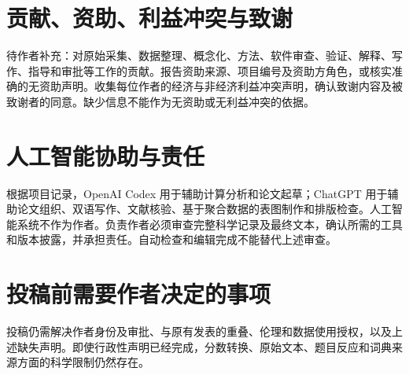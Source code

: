 \section{贡献、资助、利益冲突与致谢}
待作者补充：对原始采集、数据整理、概念化、方法、软件审查、验证、解释、写作、指导和审批等工作的贡献。报告资助来源、项目编号及资助方角色，或核实准确的无资助声明。收集每位作者的经济与非经济利益冲突声明，确认致谢内容及被致谢者的同意。缺少信息不能作为无资助或无利益冲突的依据。

\section{人工智能协助与责任}
根据项目记录，OpenAI Codex 用于辅助计算分析和论文起草；ChatGPT 用于辅助论文组织、双语写作、文献核验、基于聚合数据的表图制作和排版检查。人工智能系统不作为作者。负责作者必须审查完整科学记录及最终文本，确认所需的工具和版本披露，并承担责任。自动检查和编辑完成不能替代上述审查。

\section{投稿前需要作者决定的事项}
投稿仍需解决作者身份及审批、与原有发表的重叠、伦理和数据使用授权，以及上述缺失声明。即使行政性声明已经完成，分数转换、原始文本、题目反应和词典来源方面的科学限制仍然存在。

